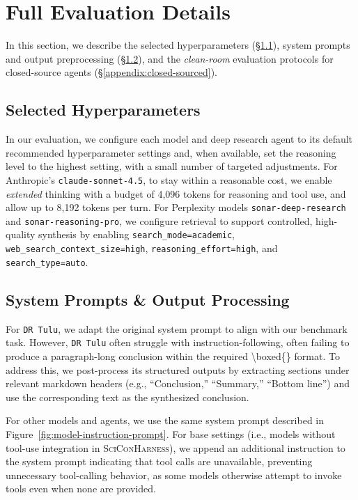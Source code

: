 \documentclass{article}
\begin{document}
\clearpage

\section{Full Evaluation Details}\label{appendix:full-evaluation-details}

In this section, we describe the selected hyperparameters (\S\ref{appendix:hyperparameters}), system prompts and output preprocessing (\S\ref{appendix:prompt-output}), and the \textit{clean-room} evaluation protocols for closed-source agents (\S\ref{appendix:closed-sourced}).

\subsection{Selected Hyperparameters}\label{appendix:hyperparameters}
In our evaluation, we configure each model and deep research agent to its default recommended hyperparameter settings and, when available, set the reasoning level to the highest setting, with a small number of targeted adjustments. For Anthropic's \texttt{claude-sonnet-4.5}, to stay within a reasonable cost, we enable \textit{extended} thinking with a budget of 4{,}096 tokens for reasoning and tool use, and allow up to 8{,}192 tokens per turn. For Perplexity models \texttt{sonar-deep-research} and \texttt{sonar-reasoning-pro}, we configure retrieval to support controlled, high-quality synthesis by enabling \texttt{search\_mode=academic}, \texttt{web\_search\_context\_size=high}, \texttt{reasoning\_effort=high}, and \texttt{search\_type=auto}.

\subsection{System Prompts \& Output Processing }\label{appendix:prompt-output}

For \texttt{DR Tulu}, we adapt the original system prompt \cite{shao2025drtulureinforcementlearning} to align with our benchmark task. However, \texttt{DR Tulu} often struggle with instruction-following, often failing to produce a paragraph-long conclusion within the required \textbackslash boxed\{\} format. To address this, we post-process its structured outputs by extracting sections under relevant markdown headers (e.g., ``Conclusion,'' ``Summary,'' ``Bottom line'') and use the corresponding text as the synthesized conclusion.
 
For other models and agents, we use the same system prompt described in Figure~\ref{fig:model-instruction-prompt}. For base settings (i.e., models without tool-use integration in \textsc{SciConHarness}), we append an additional instruction to the system prompt indicating that tool calls are unavailable, preventing unnecessary tool-calling behavior, as some models otherwise attempt to invoke tools even when none are provided.
\end{document}
